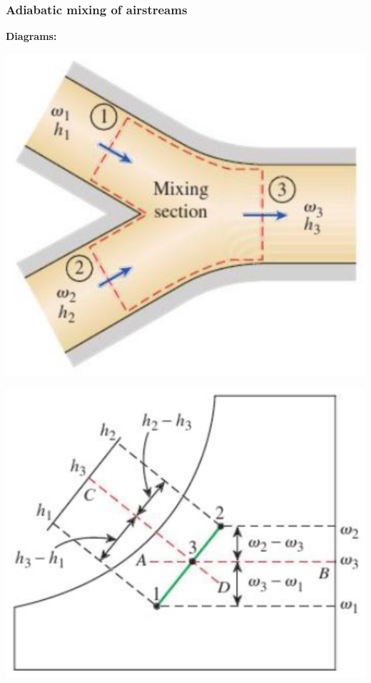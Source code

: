 \documentclass[11pt]{article}
\begin{document}
\subsubsection{Adiabatic mixing of airstreams}
\label{sec:orgfd74095}
\textbf{Diagrams:}
\begin{center}
\includegraphics[scale=0.8]{./images/adiabatic-mixing-of-airstreams-diagram.png}
\end{center}

\begin{center}
\includegraphics[scale=0.9]{./images/adiabatic-mixing-of-airstreams-psychrometric-chart.png}
\end{center}
\end{document}
